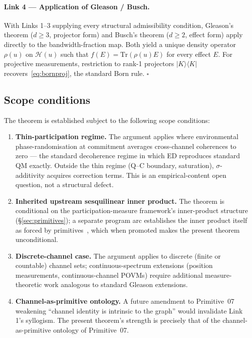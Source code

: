 \documentclass[11pt,a4paper]{article}
\begin{document}
\paragraph{Link 4 --- Application of Gleason / Busch.} With Links 1--3 supplying every structural admissibility condition, Gleason's theorem ($d \geq 3$, projector form) and Busch's theorem ($d \geq 2$, effect form) apply directly to the bandwidth-fraction map. Both yield a unique density operator $\rho(u)$ on $\mathcal{H}(u)$ such that $f(E) = \mathrm{Tr}(\rho(u) E)$ for every effect $E$. For projective measurements, restriction to rank-1 projectors $|K\rangle\langle K|$ recovers~\eqref{eq:bornproj}, the standard Born rule. \hfill$\square$

\subsection{Scope conditions}

The theorem is established subject to the following scope conditions:

\begin{enumerate}
  \item \textbf{Thin-participation regime.} The argument applies where environmental phase-randomisation at commitment averages cross-channel coherences to zero --- the standard decoherence regime in which ED reproduces standard QM exactly. Outside the thin regime (Q--C boundary, saturation), $\sigma$-additivity acquires correction terms. This is an empirical-content open question, not a structural defect.
  \item \textbf{Inherited upstream sesquilinear inner product.} The theorem is conditional on the participation-measure framework's inner-product structure (\S\ref{sec:primitives}); a separate program arc establishes the inner product itself as forced by primitives~\cite{u2discrete,u2continuum}, which when promoted makes the present theorem unconditional.
  \item \textbf{Discrete-channel case.} The argument applies to discrete (finite or countable) channel sets; continuous-spectrum extensions (position measurements, continuous-channel POVMs) require additional measure-theoretic work analogous to standard Gleason extensions.
  \item \textbf{Channel-as-primitive ontology.} A future amendment to Primitive~07 weakening ``channel identity is intrinsic to the graph'' would invalidate Link 1's syllogism. The present theorem's strength is precisely that of the channel-as-primitive ontology of Primitive~07.
\end{enumerate}
\end{document}
